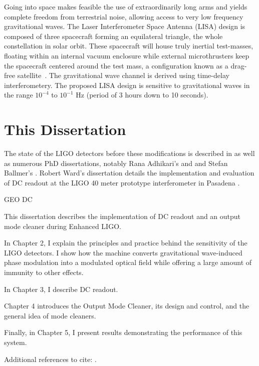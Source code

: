 Going into space makes feasible the use of extraordinarily long arms
and yields complete freedom from terrestrial noise, allowing access to
very low frequency gravitational waves.  The Laser Interferometer
Space Antenna (LISA) design is composed of three spacecraft forming an
equilateral triangle, the whole constellation in solar orbit.  These
spacecraft will house truly inertial test-masses, floating within an
internal vacuum enclosure while external microthrusters keep the
spacecraft centered around the test mass, a configuration known as a drag-free satellite~\cite{Lange1964DragFree}.  The gravitational wave
channel is derived using time-delay interferometery.  The proposed
LISA design is sensitive to gravitational waves in the range $10^{-4}$
to $10^{-1}$ Hz (period of 3 hours down to 10 seconds).

\section{This Dissertation}


The state of the LIGO detectors before these modifications is
described in \cite{S5InstrumentPaper} as well as numerous PhD
dissertations, notably Rana Adhikari's \cite{RanaThesis} and and
Stefan Ballmer's \cite{Ballmer2006LIGO}.  Robert Ward's dissertation
details the implementation and evaluation of DC readout at the LIGO 40
meter prototype interferometer in Pasadena \cite{RobWardThesis}.

GEO DC\cite{GeoDC,Degallaix2010Commissioning}


This dissertation describes the implementation of DC readout and an
output mode cleaner during Enhanced LIGO.



In Chapter 2, I explain the principles and practice behind the
sensitivity of the LIGO detectors.  I show how the machine converts
gravitational wave-induced phase modulation into a modulated optical
field while offering a large amount of immunity to other effects.

In Chapter 3, I describe DC readout.

Chapter 4 introduces the Output Mode Cleaner, its design and control,
and the general idea of mode cleaners.

Finally, in Chapter 5, I present results demonstrating the performance
of this system.

Additional references to cite: \cite{Garfinkle2005Gauge, Heinzel1999Advanced,Saulson1994Fundamentals, Harris1996Gravitational,Melissinos2010Response}.
